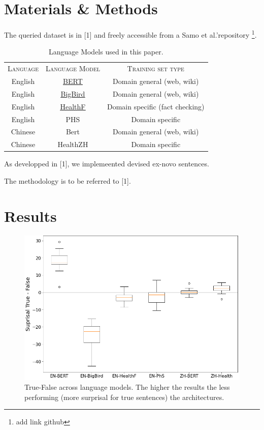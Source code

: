 \documentclass{IOS-Book-Article}
\begin{document}
\section{Materials \& Methods}

The queried dataset is in [1] and freely accessible from a Samo et al.'repository \footnote{add link github}. 

\begin{table}[]
    \centering
    \begin{tabular}{c|c|c}
         \textsc{Language} & \textsc{Language Model} & \textsc{Training set type}\\
         English & \href{https://huggingface.co/docs/transformers/model_doc/bert}{\underline{BERT}} & Domain general (web, wiki)\\
         English & \href{https://huggingface.co/docs/transformers/model_doc/big_bird}{\underline{BigBird}} & Domain general (web, wiki)\\
         English & \href{https://huggingface.co/austinmw/distilbert-base-uncased-finetuned-health_facts}{\underline{HealthF}} & Domain specific (fact checking)\\
         English & PHS & Domain specific\\
         Chinese & Bert & Domain general (web, wiki)\\
         Chinese & HealthZH & Domain specific\\
         
    \end{tabular}
    \caption{Language Models used in this paper.}
    \label{tab:my_label}
\end{table}

As developped in [1], we implemeented devised ex-novo sentences. 

The methodology is to be referred to [1].

\section{Results}

\begin{figure}
    \centering
    \includegraphics[scale=0.35]{graphmatplot}
    \caption{True-False across language models. The higher the results the less performing (more surprisal for true sentences) the architectures.}
    \label{fig:my_label}
\end{figure}
\end{document}
